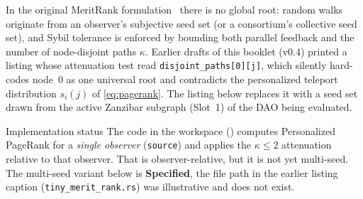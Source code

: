 \documentclass[a4paper,11pt,twoside,parskip=half-,headings=small]{scrartcl}
\newcommand{\stSpec}{\textcolor{mute}{\textbf{Specified}}}
\newcommand{\code}[1]{\texttt{#1}}
\begin{document}
In the original MeritRank formulation~\cite{nasrulin2022meritrank} there is no global root:
random walks originate from an observer's subjective seed set (or a consortium's collective seed
set), and Sybil tolerance is enforced by bounding both parallel feedback and the number of
node-disjoint paths $\kappa$. Earlier drafts of this booklet (v0.4) printed a listing whose
attenuation test read \code{disjoint\_paths[0][j]}, which silently hard-codes node~0 as one
universal root and contradicts the personalized teleport distribution $s_i(j)$ of
\cref{eq:pagerank}. The listing below replaces it with a seed set drawn from the active
Zanzibar subgraph (Slot~1) of the DAO being evaluated.

\begin{warnbox}{Implementation status}
The code in the workspace () computes
Personalized PageRank for a \emph{single observer} (\code{source}) and applies the $\kappa \le 2$ attenuation
relative to that observer. That is observer-relative, but it is not yet multi-seed.
The multi-seed variant below is \stSpec{}, the file path in the earlier listing caption
(\code{tiny\_merit\_rank.rs}) was illustrative and does not exist.
\end{warnbox}
\end{document}
